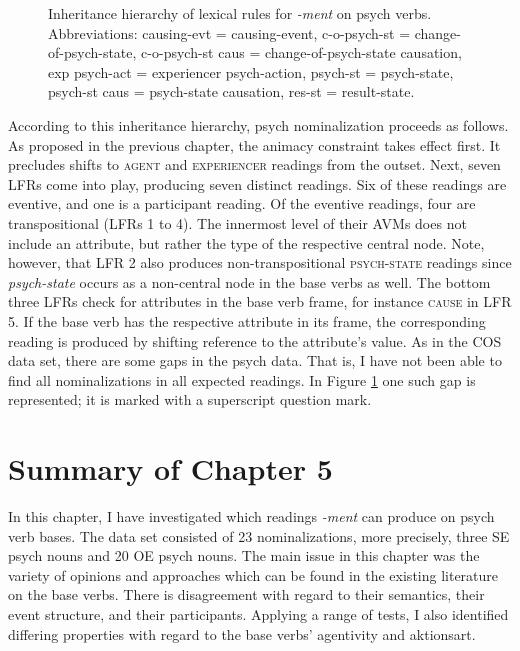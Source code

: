 \begin{figure}
{
	}
	\caption[Inheritance hierarchy of lexical rules for \textit{-ment} on psych verbs]{Inheritance hierarchy of lexical rules for \textit{-ment} on psych verbs. Abbreviations: causing-evt = causing-event, c-o-psych-st = change-of-psych-state, c-o-psych-st caus = change-of-psych-state causation, exp psych-act = experiencer psych-action, psych-st = psych-state, psych-st caus = psych-state causation, res-st = result-state.}
	\label{fig:inheritance-complete-vert2}
\end{figure}

According to this inheritance hierarchy, psych nominalization proceeds as follows.
As proposed in the previous chapter, the animacy constraint takes effect first. It precludes shifts to \textsc{agent} and \textsc{experiencer} readings from the outset. 
Next, seven LFRs come into play, producing seven distinct readings. Six of these readings are eventive, and one is a participant reading. Of the eventive readings, four are transpositional (LFRs 1 to 4). The innermost level of their AVMs does not include an attribute, but rather the type of the respective central node. Note, however, that LFR 2 also produces non-transpositional \textsc{psych-state} readings since \textit{psych-state} occurs as a non-central node in the base verbs as well. 
The bottom three LFRs check for attributes in the base verb frame, for instance \textsc{cause} in LFR 5. If the base verb has the respective attribute in its frame, the corresponding reading is produced by shifting reference to the attribute's value.
As in the COS data set, there are some gaps in the psych data. That is, I have not been able to find all nominalizations in all expected readings. In Figure \ref{fig:inheritance-complete-vert2} one such gap is represented; it is marked with a superscript question mark.

\section{Summary of Chapter 5}
\label{sec:psy-output-sum}

In this chapter, I have investigated which readings \textit{-ment} can produce on psych verb bases. The data set consisted of 23 nominalizations, more precisely, three SE psych nouns and 20 OE psych nouns. The main issue in this chapter was the variety of opinions and approaches which can be found in the existing literature on the base verbs. There is disagreement with regard to their semantics, their event structure, and their participants. Applying a range of tests, I also identified differing properties with regard to the base verbs' agentivity and aktionsart.

